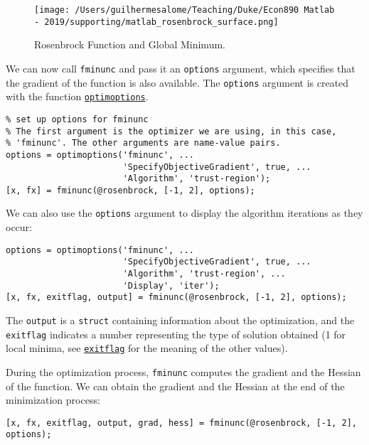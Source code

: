 \documentclass[12pt, a4paper]{article}
\begin{document}
\begin{figure}[H]
\centering
\texttt{[image: /Users/guilhermesalome/Teaching/Duke/Econ890 Matlab - 2019/supporting/matlab\_rosenbrock\_surface.png]}
\caption{\label{fig:orgc91c718}
Rosenbrock Function and Global Minimum.}
\end{figure}

We can now call \texttt{fminunc} and pass it an \texttt{options} argument, which specifies that the gradient of the function is also available.
The \texttt{options} argument is created with the function \href{https://www.mathworks.com/help/optim/ug/optimoptions.html?s\_tid=doc\_ta}{\texttt{optimoptions}}.
\lstset{language=matlab,label= ,caption= ,captionpos=b,firstnumber=1,numbers=left,style=Matlab-editor}
\begin{lstlisting}
% set up options for fminunc
% The first argument is the optimizer we are using, in this case,
% 'fminunc'. The other arguments are name-value pairs.
options = optimoptions('fminunc', ...
                       'SpecifyObjectiveGradient', true, ...
                       'Algorithm', 'trust-region');
[x, fx] = fminunc(@rosenbrock, [-1, 2], options);
\end{lstlisting}

We can also use the \texttt{options} argument to display the algorithm iterations as they occur:
\lstset{language=matlab,label= ,caption= ,captionpos=b,firstnumber=1,numbers=left,style=Matlab-editor}
\begin{lstlisting}
options = optimoptions('fminunc', ...
                       'SpecifyObjectiveGradient', true, ...
                       'Algorithm', 'trust-region', ...
                       'Display', 'iter');
[x, fx, exitflag, output] = fminunc(@rosenbrock, [-1, 2], options);
\end{lstlisting}
The \texttt{output} is a \texttt{struct} containing information about the optimization, and the \texttt{exitflag} indicates a number representing the type of solution obtained (1 for local minima, see \href{https://www.mathworks.com/help/optim/ug/fminunc.html?s\_tid=doc\_ta\#butpb7p-exitflag}{\texttt{exitflag}} for the meaning of the other values).

During the optimization process, \texttt{fminunc} computes the gradient and the Hessian of the function.
We can obtain the gradient and the Hessian at the end of the minimization process:
\lstset{language=matlab,label= ,caption= ,captionpos=b,firstnumber=1,numbers=left,style=Matlab-editor}
\begin{lstlisting}
[x, fx, exitflag, output, grad, hess] = fminunc(@rosenbrock, [-1, 2], options);
\end{lstlisting}
\end{document}
